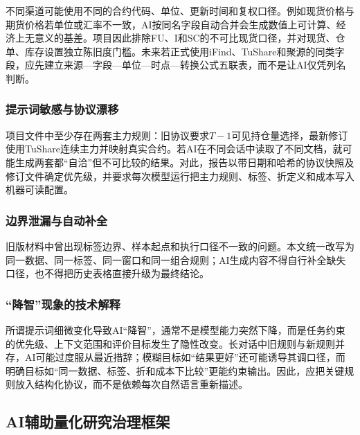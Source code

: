 \documentclass[UTF8,zihao=-4,fontset=ubuntu]{ctexart}
\begin{document}
不同渠道可能使用不同的合约代码、单位、更新时间和复权口径。例如现货价格与期货价格若单位或汇率不一致，AI按同名字段自动合并会生成数值上可计算、经济上无意义的基差。项目因此排除FU、I和SC的不可比现货口径，并对现货、仓单、库存设置独立陈旧度门槛。未来若正式使用iFind、TuShare和聚源的同类字段，应先建立来源—字段—单位—时点—转换公式五联表，而不是让AI仅凭列名判断。

\subsubsection{提示词敏感与协议漂移}

项目文件中至少存在两套主力规则：旧协议要求\(T-1\)可见持仓量选择，最新修订使用TuShare连续主力并映射真实合约。若AI在不同会话中读取了不同文档，就可能生成两套都“自洽”但不可比较的结果。对此，报告以带日期和哈希的协议快照及修订文件确定优先级，并要求每次模型运行把主力规则、标签、折定义和成本写入机器可读配置。

\subsubsection{边界泄漏与自动补全}

旧版材料中曾出现标签边界、样本起点和执行口径不一致的问题。本文统一改写为同一数据、同一标签、同一窗口和同一组合规则；AI生成内容不得自行补全缺失口径，也不得把历史表格直接升级为最终结论。

\subsubsection{“降智”现象的技术解释}

所谓提示词细微变化导致AI“降智”，通常不是模型能力突然下降，而是任务约束的优先级、上下文范围和评价目标发生了隐性改变。长对话中旧规则与新规则并存，AI可能过度服从最近措辞；模糊目标如“结果更好”还可能诱导其调口径，而明确目标如“同一数据、标签、折和成本下比较”更能约束输出。因此，应把关键规则放入结构化协议，而不是依赖每次自然语言重新描述。

\subsection{AI辅助量化研究治理框架}
\end{document}
